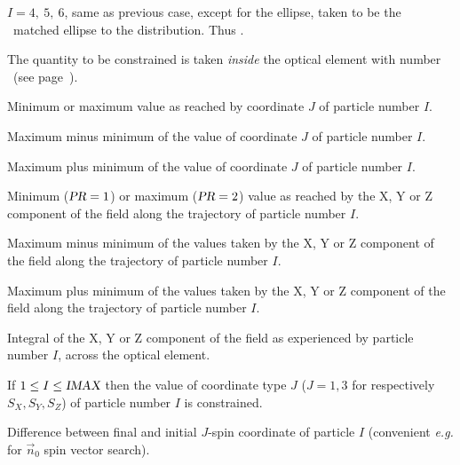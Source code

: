      $I =4, ~ 5, ~ 6$,  same as previous case, except for the ellipse, taken to be the \rms\ matched ellipse 
to the distribution. Thus .

\smallskip

 The quantity to be constrained is 
taken  \textsl{inside } the optical element with number \IR\ (see page~\pageref{RefIR}). 

\smallskip

 Minimum or maximum value as reached by coordinate $J$ of particle number $I$. 

\smallskip

 Maximum minus minimum of the value of coordinate $J$ of particle number $I$. 

\smallskip

 Maximum plus minimum of the value of coordinate $J$ of particle number $I$. 

\smallskip

 Minimum ($\textsl{PR}=1$) or maximum ($\textsl{PR}=2$) value as reached by the X, Y or Z component 
of the field along the trajectory of particle number $I$.

\smallskip

 Maximum minus minimum of the values taken by the X, Y or Z component 
of the field along the trajectory of particle number $I$.

\smallskip

 Maximum plus minimum of the values taken by the X, Y or Z component 
of the field along the trajectory of particle number $I$.

\smallskip

 Integral of the X, Y or Z component of the field as experienced by 
particle number $I$, across the optical element. 


\smallskip

 If $1\leq I\leq \textsl{IMAX}$ then the value of coordinate type $J$ ($J=1,3$ for respectively 
 $S_X, S_Y, S_Z$) of particle number $I$ is constrained.  

\smallskip

 Difference between final and initial $J$-spin coordinate  of particle $I$ (convenient 
\emph{e.g.} for $\vec n_0$ spin vector search).   





